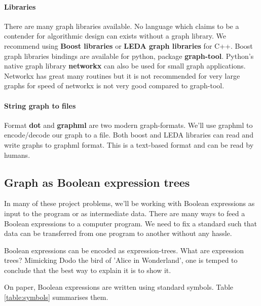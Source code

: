 \paragraph{Libraries}

  There are many graph libraries available. No language which claims to be a
  contender for algorithmic design can exists without a graph library. We
  recommend using \textbf{Boost libraries} or \textbf{LEDA graph libraries} for
  C++. Boost graph libraries bindings are available for python, package
  \textbf{graph-tool}.  Python's native graph library \textbf{networkx} can also
  be used for small graph applications. Networkx has great many routines but it
  is not recommended for very large graphs for speed of networkx is not very
  good compared to graph-tool.

\paragraph{String graph to files}

   Format \textbf{dot} and \textbf{graphml} are two modern graph-formats. We'll
   use graphml to encode/decode our graph to a file. Both boost and LEDA
   libraries can read and write graphs to graphml format. This is a text-based
   format and can be read by humans.

\subsection{Graph as Boolean expression trees}

    In many of these project problems, we'll be working with Boolean expressions
    as input to the program or as intermediate data.  There are many ways to
    feed a Boolean expressions to a computer program. We need to fix a standard
    such that data can be transferred from one program to another without any
    hassle. 

    Boolean expressions can be encoded as expression-trees. What are expression
    trees? Mimicking Dodo the bird of 'Alice in Wonderland', one is temped to
    conclude that the best way to explain it is to show it. 

    On paper, Boolean expressions are written using standard symbols.  Table
    \ref{table:symbols} summarises them.

